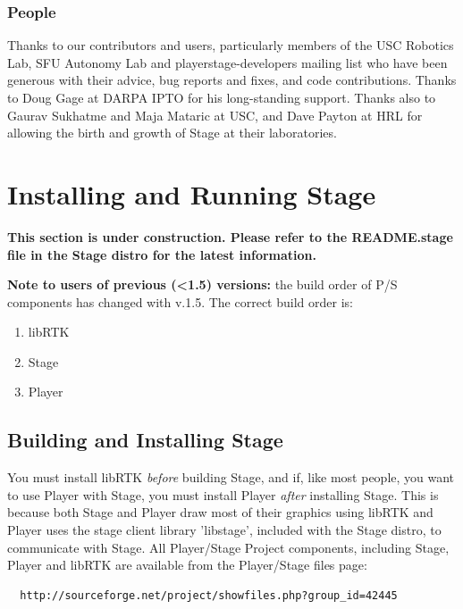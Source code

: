 \documentclass[letter,11pt,twoside]{report}
\begin{document}
\subsection{People}

Thanks to our contributors and users, particularly members of the USC
Robotics Lab, SFU Autonomy Lab and playerstage-developers mailing list
who have been generous with their advice, bug reports and fixes, and
code contributions. Thanks to Doug Gage at DARPA IPTO for his
long-standing support. Thanks also to Gaurav Sukhatme and Maja Mataric
at USC, and Dave Payton at HRL for allowing the birth and growth of
Stage at their laboratories.

\chapter{Installing and Running Stage}

{\bf This section is under construction. Please refer to the
  README.stage file in the Stage distro for the latest information.}

{\bf Note to users of previous (<1.5) versions:} the build order of
P/S components has changed with v.1.5. The correct build order is:

\begin{enumerate}
\item libRTK
\item Stage
\item Player
\end{enumerate}

\section{Building and Installing Stage}

You must install libRTK {\em before} building Stage, and if, like most
people, you want to use Player with Stage, you must install Player
{\em after} installing Stage. This is because both Stage and Player
draw most of their graphics using libRTK and Player uses the stage
client library 'libstage', included with the Stage distro, to
communicate with Stage.  All Player/Stage Project components,
including Stage, Player and libRTK are available from the Player/Stage
files page:

\begin{verbatim}
  http://sourceforge.net/project/showfiles.php?group_id=42445
\end{verbatim}
\end{document}
